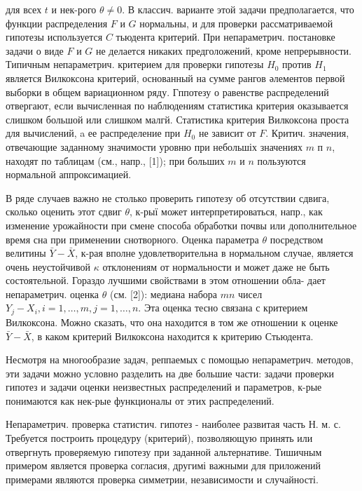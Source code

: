 \documentclass[10pt]{article}
\begin{document}
для всех $t$ и нек-рого $\theta \neq 0$. В классич. варианте этой задачи предполагается, что функции распределения $F$ и $G$ нормальны, и для проверки рассматриваемой гипотезы используется $C$ тьюдента критерий. При непараметрич. постановке задачи о виде $F$ и $G$ не делается никаких предголожений, кроме непрерывности. Типичным непараметрич. критерием для проверки гипотезы $H_{0}$ против $H_{1}$ является Вилкоксона критерий, основанный на сумме рангов әлементов первой выборки в общем вариационном ряду. Гппотезу о равенстве распределений отвергают, если вычисленная по наблюдениям статистика критерия оказывается слишком большой или слишком малгй. Статистика критерия Вилкоксона проста для вычислений, a ее распределение при $H_{0}$ не зависит от $F$. Критич. значения, отвечающие заданному значимости уровню при небольшіх значениях $m$ п $n$, находят по таблицам (см., напр., [1]); при больших $m$ и $n$ пользуются нормальной аппроксимацией.



В ряде случаев важно не столько проверить гипотезу об отсутствии сдвига, сколько оценить этот сдвиг $\theta$, к-рыї может интерпретироваться, напр., как изменение урожайности при смене способа обработки почвы или дополнительное время сна при применении снотворного. Оценка параметра $\theta$ посредством велитины $\bar{Y}-\bar{X}$, к-рая вполне удовлетворительна в нормальном случае, является очень неустойчивой $\kappa$ отклонениям от нормальности и может даже не быть состоятельной. Гораздо лучшими свойствами в этом отношении обла- дает непараметрич. оценка $\theta$ (см. [2]): медиана набора $m n$ чисел $Y_{j}-X_{i}, i=1, \ldots, m, j=1, \ldots, n$. Эта оценка тесно связана с критерием Вилкоксона. Можно сказать, что она находится в том же отношении к оценке $\bar{Y}-\bar{X}$, в каком критерий Вилкоксона находится к критерию Стьюдента.



Несмотря на многообразие задач, реппаемых с помощью непараметрич. методов, эти задачи можно условно разделить на две большие части: задачи проверки гипотез и задачи оценки неизвестных распределений и параметров, к-рые понимаются как нек-рые функционалы от этих распределений.



Непараметрич. проверка статистич. гипотез - наиболее развитая часть Н. м. с. Требуется построить процедуру (критерий), позволяющую принять или отвергнуть проверяемую гипотезу при заданной альтернативе. Тишичным примером является проверка согласия, другимі важными для приложений примерами являются проверка симметрии, независимости и случайності.
\end{document}
